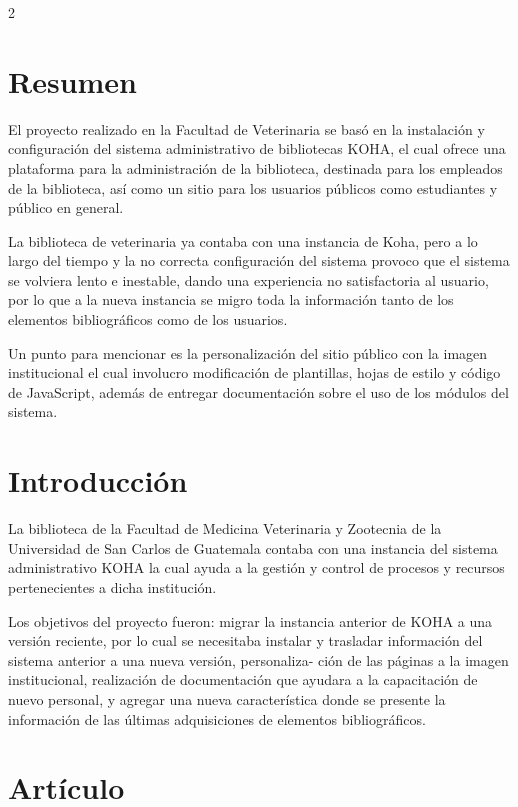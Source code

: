 \documentclass[12pt,spanish,Letterpaper,openany]{book}
\begin{document}
\begin {multicols}{2}

\hypertarget{resumen-3}{%
\section{Resumen}\label{resumen-3}}

El proyecto realizado en la Facultad de Veterinaria se basó en la instalación y configuración del sistema administrativo de bibliotecas KOHA, el cual ofrece una plataforma para la administración de la biblioteca, destinada para los empleados de la biblioteca, así como un sitio para los usuarios públicos como estudiantes y público en general.

La biblioteca de veterinaria ya contaba con una instancia de Koha, pero a lo largo del tiempo y la no correcta configuración del sistema provoco que el sistema se volviera lento e inestable, dando una experiencia no satisfactoria al usuario, por lo que a la nueva instancia se migro toda la información tanto de los elementos bibliográficos como de los usuarios.

Un punto para mencionar es la personalización del sitio público con la imagen institucional el cual involucro modificación de plantillas, hojas de estilo y código de JavaScript, además de entregar documentación sobre el uso de los módulos del sistema.

\hypertarget{introducciuxf3n-5}{%
\section{Introducción}\label{introducciuxf3n-5}}

La biblioteca de la Facultad de Medicina Veterinaria y Zootecnia de la Universidad de San Carlos de Guatemala contaba con una instancia del sistema administrativo KOHA la cual ayuda a la gestión y control de procesos y recursos pertenecientes a dicha institución.

Los objetivos del proyecto fueron: migrar la instancia anterior de KOHA a una versión reciente, por lo cual se necesitaba instalar y trasladar información del sistema anterior a una nueva versión, personaliza-
ción de las páginas a la imagen institucional, realización de documentación que ayudara a la capacitación de nuevo personal, y agregar una nueva característica donde se presente la información de las últimas adquisiciones de elementos bibliográficos.

\hypertarget{artuxedculo-4}{%
\section{Artículo}\label{artuxedculo-4}}


\end{multicols}
\end{document}
